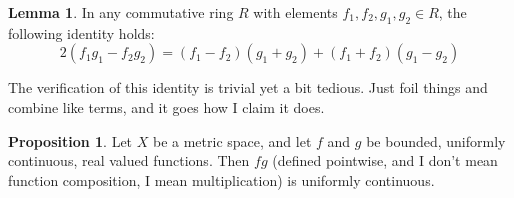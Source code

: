 \documentclass[11pt]{article}
\theoremstyle{definition}
\newtheorem{proposition}{Proposition}
\newtheorem{lemma}{Lemma}
\begin{document}
\begin{lemma}
In any commutative ring $R$ with elements $f_1, f_2,g_1,g_2\in R$, the following identity holds:
\[ 2(f_1g_1 - f_2g_2) = (f_1 - f_2)(g_1 + g_2) + (f_1 + f_2)(g_1 - g_2) \]
\end{lemma}

The verification of this identity is trivial yet a bit tedious. Just foil things and combine like terms, and it goes how I claim it does.

\begin{proposition}
Let $X$ be a metric space, and let $f$ and $g$ be bounded, uniformly continuous, real valued functions. Then $fg$ (defined pointwise, and I don't mean function composition, I mean multiplication) is uniformly continuous. 
\end{proposition}
\end{document}
